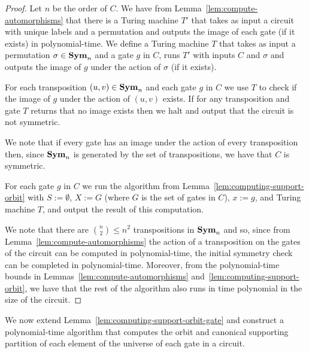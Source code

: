 \documentclass[../main/thesis.tex]{subfiles}
\begin{document}
\begin{proof}
  Let $n$ be the order of $C$. We have from
  Lemma~\ref{lem:compute-automorphisms} that there is a Turing machine $T'$ that
  takes as input a circuit with unique labels and a permutation and outputs the
  image of each gate (if it exists) in polynomial-time. We define a Turing
  machine $T$ that takes as input a permutation $\sigma \in \text{\textbf{Sym}}_n$ and a gate
  $g$ in $C$, runs $T'$ with inputs $C$ and $\sigma$ and outputs the image of
  $g$ under the action of $\sigma$ (if it exists).

  For each transposition $(u,v) \in \text{\textbf{Sym}}_n$ and each gate $g$ in $C$ we use $T$
  to check if the image of $g$ under the action of $(u,v)$ exists. If for any
  transposition and gate $T$ returns that no image exists then we halt and
  output that the circuit is not symmetric.

  We note that if every gate has an image under the action of every
  transposition then, since $\text{\textbf{Sym}}_n$ is generated by the set of transpositions,
  we have that $C$ is symmetric.

  For each gate $g$ in $C$ we run the algorithm from
  Lemma~\ref{lem:computing-support-orbit} with $S := \emptyset$, $X := G$ (where
  $G$ is the set of gates in $C$), $x := g$, and Turing machine $T$, and output
  the result of this computation.
  
  We note that there are ${{n}\choose{2}} \leq n^2$ transpositions in $\text{\textbf{Sym}}_n$
  and so, since from Lemma~\ref{lem:compute-automorphisms} the action of a
  transposition on the gates of the circuit can be computed in polynomial-time,
  the initial symmetry check can be completed in polynomial-time. Moreover, from
  the polynomial-time bounds in Lemmas~\ref{lem:compute-automorphisms}
  and~\ref{lem:computing-support-orbit}, we have that the rest of the algorithm
  also runs in time polynomial in the size of the circuit.
\end{proof}

We now extend Lemma~\ref{lem:computing-support-orbit-gate} and construct a
polynomial-time algorithm that computes the orbit and canonical supporting
partition of each element of the universe of each gate in a circuit.
\end{document}
